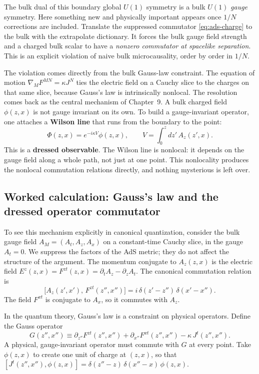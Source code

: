 The bulk dual of this boundary global $U(1)$ symmetry is a bulk $U(1)$ \emph{gauge} symmetry. Here something new
and physically important appears once $1/N$ corrections are included. Translate the suppressed commutator
\eqref{eq:ads-charge} to the bulk with the extrapolate dictionary. It forces the bulk gauge field strength and a
charged bulk scalar to have a \emph{nonzero commutator at spacelike separation}. This is an explicit violation of
naive bulk microcausality, order by order in $1/N$.

The violation comes directly from the bulk Gauss-law constraint. The equation of motion
$\nabla_MF^{MN}=\kappa J^N$ ties the electric field on a Cauchy slice to the charges on that same slice, because
Gauss's law is intrinsically nonlocal. The resolution comes back as the central mechanism of Chapter~9. A bulk
charged field $\phi(z,x)$ is not gauge invariant on its own. To build a gauge-invariant operator, one attaches a
\textbf{Wilson line} that runs from the boundary to the point:
\begin{equation}
\Phi(z,x) = e^{-i\kappa V}\phi(z,x), \qquad V=\int_0^z dz'\,A_z(z',x) .
\label{eq:ads-dressed}
\end{equation}
This is a \textbf{dressed observable}. The Wilson line is nonlocal: it depends on the gauge field along a whole
path, not just at one point. This nonlocality produces the nonlocal commutation relations directly, and nothing
mysterious is left over.

\subsection*{Worked calculation: Gauss's law and the dressed operator commutator}

To see this mechanism explicitly in canonical quantization, consider the bulk gauge field
$A_M = (A_t, A_z, A_x)$ on a constant-time Cauchy slice, in the gauge $A_t = 0$. We suppress the factors of the
AdS metric; they do not affect the structure of the argument. The momentum conjugate to $A_z(z,x)$ is the
electric field $E^z(z,x) = F^{zt}(z,x) = \partial_t A_z - \partial_z A_t$. The canonical commutation relation is
\[
\big[A_z(z',x'),\, F^{zt}(z'',x'')\big] = i\,\delta(z'-z'')\,\delta(x'-x'') .
\]
The field $F^{xt}$ is conjugate to $A_x$, so it commutes with $A_z$.

In the quantum theory, Gauss's law is a constraint on physical operators. Define the Gauss operator
\[
G(z'',x'') \equiv \partial_{z''} F^{zt}(z'',x'') + \partial_{x''} F^{xt}(z'',x'') - \kappa\, J^t(z'',x'') .
\]
A physical, gauge-invariant operator must commute with $G$ at every point. Take $\phi(z,x)$ to create one unit
of charge at $(z,x)$, so that $[J^t(z'',x''),\phi(z,x)]=\delta(z''-z)\,\delta(x''-x)\,\phi(z,x)$.

